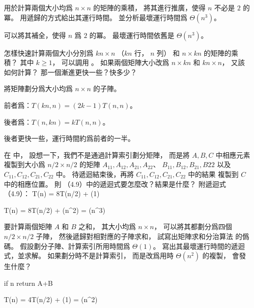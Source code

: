\startsection[
  title={Multiplying square matrices},
]

\startEXERCISE
{} 用於計算兩個大小均爲 $n\times n$ 的矩陣的乘積，
將其進行推廣，使得 $n$ 不必是 $2$ 的冪。
用遞歸的方式給出其運行時間。
並分析最壞運行時間爲 $\Theta(n^3)$。
\stopEXERCISE

\startANSWER
可以將其補全，使得 $n$ 爲 $2$ 的冪。
最壞運行時間依舊是 $\Theta(n^3)$。
\stopANSWER

\startEXERCISE
怎樣快速計算兩個大小分別爲 $k n\times n$ （$kn$ 行， $n$ 列）
和 $n\times kn$ 的矩陣的乘積？
其中 $k\ge 1$，
可以調用 。
如果兩個矩陣大小改爲 $n\times kn$ 和 $kn\times n$，
又該如何計算？
那一個漸進更快一些？快多少？
\stopEXERCISE

\startANSWER
將矩陣劃分爲大小均爲 $n\times n$ 的子陣。

前者爲：$T(kn,n) = (2k-1)T(n,n)$。

後者爲：$T(n,kn) = k T(n,n)$。

後者更快一些，運行時間約爲前者的一半。
\stopANSWER

\startEXERCISE
在  中，
設想一下，我們不是通過計算索引劃分矩陣，
而是將 $A,B,C$ 中相應元素複製到大小爲 $n/2\times n/2$ 的矩陣
$A_{11},A_{12},A_{21},A_{22}$、 $B_{11},B_{12},B_{21},B{22}$
以及 $C_{11},C_{12},C_{21},C_{22}$ 中。
待遞迴結束後，再將 $C_{11},C_{12},C_{21},C_{22}$ 中的結果
複製到 $C$ 中的相應位置。
則 （4.9）中的遞迴式要怎麼改？結果是什麼？
附遞迴式（4.9）：
\startformula
T(n) = 8T(n/2) + \Theta(1)
\stopformula
\stopEXERCISE

\startANSWER
\startformula\startmathalignment
\NC T(n) \NC = 8T(n/2) + \Theta(n^2) \NR
\NC \NC = \Theta(n^3) \NR
\stopmathalignment\stopformula
\stopANSWER

\startEXERCISE
要計算兩個矩陣 $A$ 和 $B$ 之和，
其大小均爲 $n\times n$，
可以將其都劃分爲四個 $n/2\times n/2$ 子陣，
然後遞歸對相對應的子陣求和，
試寫出矩陣求和分治算法  的僞碼。
假設劃分子陣、計算索引所用時間爲 $\Theta(1)$。
寫出其最壞運行時間的遞迴式，並求解。
如果劃分時不是計算索引，
而是改爲用時 $\Theta(n^2)$ 的複製，
會發生什麼？
\stopEXERCISE

\startANSWER
{}
\startCLRSCODE
if n 
	return A+B
\stopCLRSCODE

\startformula\startmathalignment
\NC T(n) \NC = 4T(n/2) + \Theta(1) \NR
\NC \NC = \Theta(n^2) \NR
\stopmathalignment\stopformula
\stopANSWER

\stopsection
